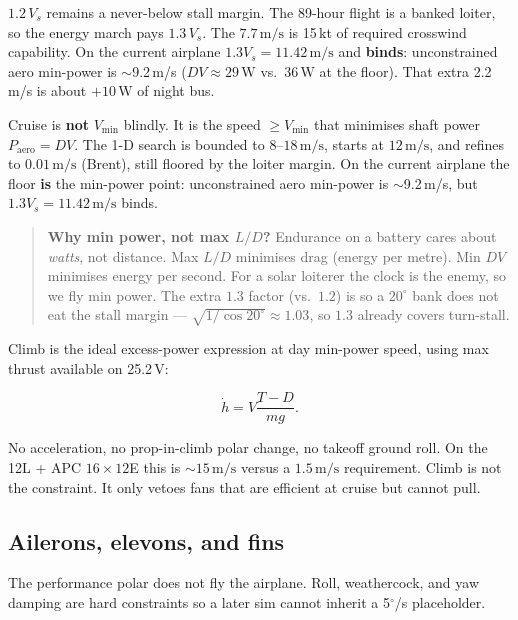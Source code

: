 \documentclass[11pt,letterpaper]{article}
\newenvironment{intuition}{\begin{quote}\small}{\end{quote}}
\begin{document}
$1.2\,V_s$ remains a never-below stall margin. The 89-hour flight is a banked loiter, so the energy march pays $1.3\,V_s$. The $7.7\,\mathrm{m/s}$ is 15\,kt of required crosswind capability. On the current airplane $1.3 V_s = 11.42\,\mathrm{m/s}$ and \textbf{binds}: unconstrained aero min-power is $\sim$9.2\,m/s ($DV \approx 29\,\mathrm{W}$ vs.\ $36\,\mathrm{W}$ at the floor). That extra 2.2\,m/s is about $+10\,\mathrm{W}$ of night bus.

Cruise is \textbf{not} $V_{\min}$ blindly. It is the speed $\ge V_{\min}$ that minimises shaft power $P_\mathrm{aero} = D V$. The 1-D search is bounded to $8$--$18\,\mathrm{m/s}$, starts at $12\,\mathrm{m/s}$, and refines to $0.01\,\mathrm{m/s}$ (Brent), still floored by the loiter margin. On the current airplane the floor \textbf{is} the min-power point: unconstrained aero min-power is $\sim$9.2\,m/s, but $1.3 V_s = 11.42\,\mathrm{m/s}$ binds.

\begin{intuition}
\textbf{Why min power, not max $L/D$?} Endurance on a battery cares about \emph{watts}, not distance. Max $L/D$ minimises drag (energy per metre). Min $D V$ minimises energy per second. For a solar loiterer the clock is the enemy, so we fly min power. The extra $1.3$ factor (vs.\ $1.2$) is so a $20^\circ$ bank does not eat the stall margin --- $\sqrt{1/\cos 20^\circ}\approx 1.03$, so $1.3$ already covers turn-stall.
\end{intuition}

Climb is the ideal excess-power expression at day min-power speed, using max thrust available on 25.2\,V:

\begin{equation}
  \dot{h} = V \frac{T - D}{mg}.
\end{equation}

No acceleration, no prop-in-climb polar change, no takeoff ground roll. On the 12L + APC $16\times12$E this is $\sim 15\,\mathrm{m/s}$ versus a $1.5\,\mathrm{m/s}$ requirement. Climb is not the constraint. It only vetoes fans that are efficient at cruise but cannot pull.

\subsection{Ailerons, elevons, and fins}
\label{sec:control}

The performance polar does not fly the airplane. Roll, weathercock, and yaw damping are hard constraints so a later sim cannot inherit a 5$^\circ$/s placeholder.
\end{document}

